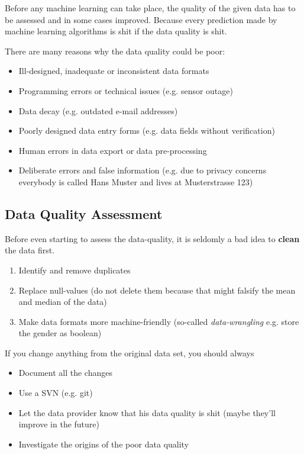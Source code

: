 \documentclass[11pt]{article}
\begin{document}
Before any machine learning can take place, the quality of the given data has to be assessed and in some cases improved. Because every prediction made by machine learning algorithms is shit if the data quality is shit.

There are many reasons why the data quality could be poor:

\begin{itemize}
    \item Ill-designed, inadequate or inconsistent data formats
    \item Programming errors or technical issues (e.g. sensor outage)
    \item Data decay (e.g. outdated e-mail addresses)
    \item Poorly designed data entry forms (e.g. data fields without verification)
    \item Human errors in data export or data pre-processing
    \item Deliberate errors and false information (e.g. due to privacy concerns everybody is called Hans Muster and lives at Musterstrasse 123)
\end{itemize}

\subsection{Data Quality Assessment}

Before even starting to assess the data-quality, it is seldomly a bad idea to \textbf{clean} the data first.

\begin{enumerate}
    \item Identify and remove duplicates
    \item Replace null-values (do not delete them because that might falsify the mean and median of the data)
    \item Make data formats more machine-friendly (so-called \textit{data-wrangling} e.g. store the gender as boolean)
\end{enumerate}

\newpage

If you change anything from the original data set, you should always

\begin{itemize}
    \item Document all the changes
    \item Use a SVN (e.g. git)
    \item Let the data provider know that his data quality is shit (maybe they'll improve in the future)
    \item Investigate the origins of the poor data quality
\end{itemize}
\end{document}
